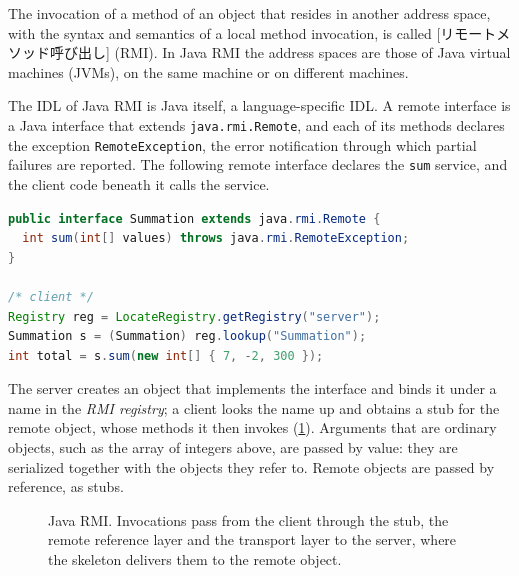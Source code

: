 \documentclass[../main.tex]{subfiles}
\begin{document}
\begin{definition}
  The invocation of a method of an object that resides in another address
  space, with the syntax and semantics of a local method invocation, is
  called [リモートメソッド呼び出し] (RMI).  In
  Java RMI the address spaces are those of Java virtual machines (JVMs),
  on the same machine or on different machines.
\end{definition}
%

The IDL of Java RMI is Java itself, a language-specific IDL.  A remote
interface is a Java interface that extends \texttt{java.rmi.Remote}, and
each of its methods declares the exception \texttt{RemoteException}, the
error notification through which partial failures are reported.
The following remote interface declares the \texttt{sum} service, and the
client code beneath it calls the service.

\begin{lstlisting}[language=Java, numbers=none]
public interface Summation extends java.rmi.Remote {
  int sum(int[] values) throws java.rmi.RemoteException;
}

/* client */
Registry reg = LocateRegistry.getRegistry("server");
Summation s = (Summation) reg.lookup("Summation");
int total = s.sum(new int[] { 7, -2, 300 });
\end{lstlisting}

The server creates an object that implements the interface and binds it
under a name in the \emph{RMI registry}; a client looks the name up and
obtains a stub for the remote object, whose methods it then invokes
(\cref{fig:l13-rmi}).  Arguments that are ordinary objects, such as the
array of integers above, are passed by value: they are serialized
together with the objects they refer to.
Remote objects are passed by
reference, as stubs.

\begin{figure}[htbp]
  \centering
  
  \caption{Java RMI.  Invocations pass from the client through the stub,
    the remote reference layer and the transport layer to the server, where
    the skeleton delivers them to the remote object.}
  \label{fig:l13-rmi}
\end{figure}
\end{document}

